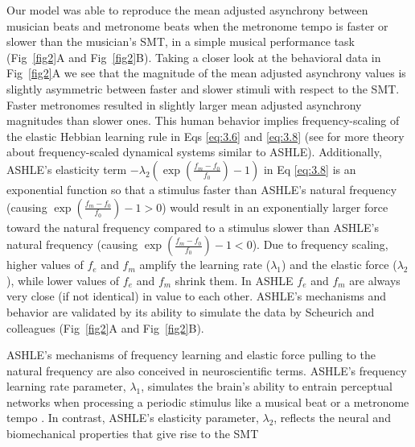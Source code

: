 \documentclass[10pt,letterpaper]{article}
\begin{document}
Our model was able to reproduce the mean adjusted asynchrony between musician beats and metronome beats when the metronome tempo is faster or slower than the musician's SMT, in a simple musical performance task (Fig~\ref{fig2}A and Fig~\ref{fig2}B). Taking a closer look at the behavioral data in Fig~\ref{fig2}A we see that the magnitude of the mean adjusted asynchrony values is slightly asymmetric between faster and slower stimuli with respect to the SMT. Faster metronomes resulted in slightly larger mean adjusted asynchrony magnitudes than slower ones. This human behavior implies frequency-scaling of the elastic Hebbian learning rule in Eqs \eqref{eq:3.6} and \eqref{eq:3.8} (see \cite{kim2015signal, large2010canonical} for more theory about frequency-scaled dynamical systems similar to ASHLE). Additionally, ASHLE's elasticity term $-\lambda_2\left(\exp\left(\frac{f_m-f_0}{f_0}\right)-1\right)$ in Eq \eqref{eq:3.8} is an exponential function so that a stimulus faster than ASHLE's natural frequency (causing $\exp\left(\frac{f_m-f_0}{f_0}\right)-1>0$) would result in an exponentially larger force toward the natural frequency compared to a stimulus slower than ASHLE's natural frequency (causing $\exp\left(\frac{f_m-f_0}{f_0}\right)-1<0$). Due to frequency scaling, higher values of $f_e$ and $f_m$ amplify the learning rate ($\lambda_1$) and the elastic force ($\lambda_2$), while lower values of $f_e$ and $f_m$ shrink them. In ASHLE $f_e$ and $f_m$ are always very close (if not identical) in value to each other. ASHLE's mechanisms and behavior are validated by its ability to simulate the data by Scheurich and colleagues \cite{scheurich2018tapping} (Fig~\ref{fig2}A and Fig~\ref{fig2}B).

ASHLE's mechanisms of frequency learning and elastic force pulling to the natural frequency are also conceived in neuroscientific terms. ASHLE's frequency learning rate parameter, $\lambda_1$, simulates the brain's ability to entrain perceptual networks when processing a periodic stimulus like a musical beat or a metronome tempo \cite{large2015neural}. In contrast, ASHLE's elasticity parameter, $\lambda_2$, reflects the neural and biomechanical properties that give rise to the SMT \cite{goodman2000advantages}
\end{document}
